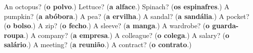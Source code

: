 \begin{tcolorbox}[breakable,colback=teal!4,colframe=teal!35!black,title={Before you move on}]
An octopus? (\textbf{o polvo}.) Lettuce? (\textbf{a alface}.) Spinach? (\textbf{os espinafres}.) A pumpkin? (\textbf{a abóbora}.) A pea? (\textbf{a ervilha}.) A sandal? (\textbf{a sandália}.) A pocket? (\textbf{o bolso}.) A zip? (\textbf{o fecho}.) A sleeve? (\textbf{a manga}.) A wardrobe? (\textbf{o guarda-roupa}.) A company? (\textbf{a empresa}.) A colleague? (\textbf{o colega}.) A salary? (\textbf{o salário}.) A meeting? (\textbf{a reunião}.) A contract? (\textbf{o contrato}.)
\end{tcolorbox}
